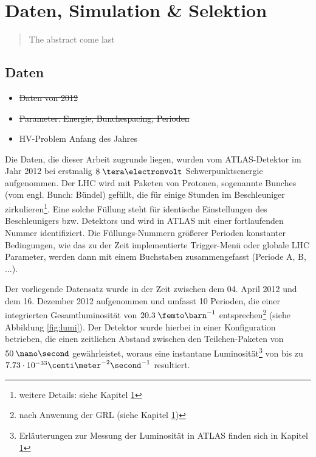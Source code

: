 


\chapter{Daten, Simulation \& Selektion}

\begin{quote}
    The abstract come last
\end{quote}



\section{Daten}
\label{data_sim_selection:data}

\begin{itemize}
    \item \sout{Daten von 2012}
    \item \sout{Parameter: Energie, Bunchespacing, Perioden}
    \item HV-Problem Anfang des Jahres
\end{itemize}

Die Daten, die dieser Arbeit zugrunde liegen, wurden vom ATLAS-Detektor im Jahr
2012 bei erstmalig $8 \TeV$ Schwerpunktsenergie aufgenommen. Der \ac{LHC} wird
mit Paketen von Protonen, sogenannte Bunches (vom engl. Bunch: Bündel) gefüllt,
die für einige Stunden im Beschleuniger zirkulieren\footnote{weitere Details:
siehe Kapitel \ref{}}.
Eine solche Füllung steht für identische Einstellungen des Beschleunigers bzw.
Detektors und wird in ATLAS mit einer fortlaufenden Nummer identifiziert.
Die Füllungs-Nummern größerer Perioden konstanter Bedingungen, wie das zu der
Zeit implementierte Trigger-Menü oder globale \ac{LHC} Parameter, werden dann
mit einem Buchstaben zusammengefasst (Periode A, B, ...).

Der vorliegende Datensatz wurde in der Zeit zwischen dem 04. April 2012 und dem
16. Dezember 2012 aufgenommen und umfasst 10 Perioden, die einer integrierten
Gesamtluminosität von $20.3 \fb^{-1}$ entsprechen\footnote{nach Anwenung der
\ac{GRL} (siehe Kapitel \ref{})} (siehe Abbildung \ref{fig:lumi}). Der Detektor
wurde hierbei in einer Konfiguration betrieben, die einen zeitlichen Abstand
zwischen den Teilchen-Paketen von $50\:\nano\second$ gewährleistet, woraus eine
instantane Luminosität\footnote{Erläuterungen zur Messung der Luminosität in
ATLAS finden sich in Kapitel \ref{}} von bis zu
$7.73 \cdot 10^{-33} \centi\meter^{-2}\second^{-1}$ resultiert.

